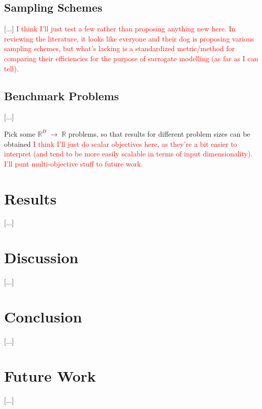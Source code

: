 \documentclass[conference]{IEEEtran}
\begin{document}
\subsection{Sampling Schemes}

[...] \textcolor{red}{I think I'll just test a few rather than proposing anything new here. In reviewing the literature, it looks like everyone and their dog is proposing various sampling schemes, but what's lacking is a standardized metric/method for comparing their efficiencies for the purpose of surrogate modelling (as far as I can tell).}

\subsection{Benchmark Problems}

[...]

Pick some $\mathbb{R}^D\;\to\;\mathbb{R}$ problems, so that results for different problem sizes can be obtained \textcolor{red}{I think I'll just do scalar objectives here, as they're a bit easier to interpret (and tend to be more easily scalable in terms of input dimensionality). I'll punt multi-objective stuff to future work.}

\section{Results}

[...]

\section{Discussion}

[...]

\section{Conclusion}

[...]

\section{Future Work}

[...]



{}

\end{document}
